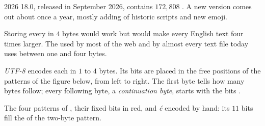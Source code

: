 \begin{dated}{2026}
 18.0, released in September 2026, contains $172{,}808$ . A new version comes out about once a
year, mostly adding  of historic scripts and new emoji.
\end{dated}

Storing every  in $4$ bytes would work but would make every English text four times larger. The 
used by most of the web and by almost every text file today uses between one and four bytes.

\begin{definition}[UTF-8]\label{def:g10:text-encodings:utf8}
\emph{UTF-8} encodes each  in $1$ to $4$ bytes. Its bits are placed in the free positions
 of the patterns of the figure below, from left to right. The first byte tells how many bytes follow; every
following byte, a \emph{continuation byte}, starts with the bits .
\end{definition}

\begin{omfigure}

{\small The four patterns of , their fixed bits in red, and \textit{é} encoded by hand: its $11$ bits
fill the \code{x} of the two-byte pattern.}
\end{omfigure}

